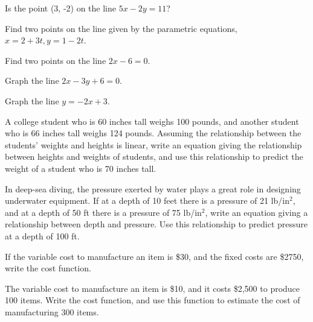 \begin{puzzle}
    Is the point (3, -2) on the line \( 5x - 2y = 11 \)?
\end{puzzle}

\begin{puzzle}
    Find two points on the line given by the parametric equations, \( x = 2 + 3t, y = 1 - 2t \).
\end{puzzle}

\begin{puzzle}
    Find two points on the line \( 2x - 6 = 0 \).
\end{puzzle}

\begin{puzzle}
    Graph the line $2x - 3y + 6 = 0$.
\end{puzzle}

\begin{puzzle}
    Graph the line $y = -2x + 3$.
\end{puzzle}

\begin{puzzle}
    A  college student who is 60 inches tall weighs 100 pounds, and another student who is 66 inches tall weighs 124 pounds. Assuming the relationship between the students’ weights and heights is linear, write an equation giving the relationship between heights and weights of students, and use this relationship to predict the weight of a student who is 70 inches tall.
\end{puzzle}

\begin{puzzle}
    In deep-sea diving, the pressure exerted by water plays a great role in designing underwater equipment. If at a depth of 10 feet there is a pressure of 21 lb/in$^2$, and at a depth of 50 ft there is a pressure of 75 lb/in$^2$, write an equation giving a relationship between depth and pressure. Use this relationship to predict pressure at a depth of 100 ft.
\end{puzzle}

\begin{puzzle}
    If the variable cost to manufacture an item is \$30, and the fixed costs are \$2750, write the cost function.
\end{puzzle}

\begin{puzzle}
    The variable cost to manufacture an item is \$10, and it costs \$2,500 to produce 100 items. Write the cost function, and use this function to estimate the cost of manufacturing 300 items.
\end{puzzle}

